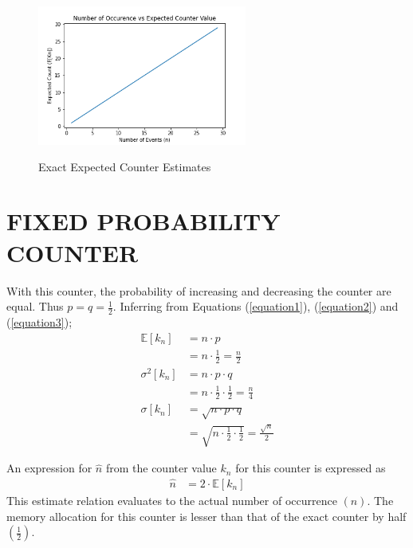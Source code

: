 \documentclass[longpaper, english, final, times]{revdetua}
\begin{document}
	 	\begin{figure}[ht!]
	 		\centering
	 		\caption{Exact Expected Counter Estimates}
	 		\includegraphics[width=260px, height=200px]{imgs/exact.png}		
	 	\end{figure}
		
				
	\section{FIXED PROBABILITY COUNTER}
		With this counter, the probability of increasing and decreasing the counter are equal. Thus $p=q=\frac{1}{2}$.
		Inferring from Equations (\ref{equation1}), (\ref{equation2}) and (\ref{equation3});
		\begin{align*}
			\mathbb{E}[k_n] &= n\cdot p\\
			&=n\cdot \frac{1}{2}=\frac{n}{2} \\
			\sigma^2[k_n] &= n\cdot p\cdot q\\
			&=n\cdot \frac{1}{2} \cdot \frac{1}{2}=\frac{n}{4} \\
			\sigma[k_n] &= \sqrt{n\cdot p\cdot q}\\
			&=\sqrt{n\cdot \frac{1}{2}\cdot \frac{1}{2}}=\frac{\sqrt{n}}{2}
		\end{align*}
	
		An expression for $\widehat{n}$ from the counter value $k_n$ for this counter is expressed as
		\begin{align*}
			\widehat{n}&= 2\cdot \mathbb{E}[k_n]
		\end{align*}
		This estimate relation evaluates to the actual number of occurrence $(n)$. The memory allocation for this counter is lesser than that of the exact counter by half $(\frac{1}{2})$.
	
\end{document}
